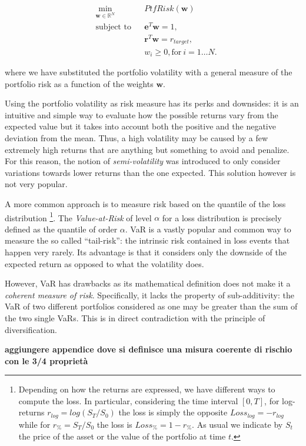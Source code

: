\begin{subequations}
	\label{eq:general_opt}
	\begin{align}
	&\!\min_{\mathbf{w}\in \mathbb{R}^{N}}     &    & PtfRisk(\mathbf{w}) \\
	& \text{subject to}   &   & \mathbf{e}^T\mathbf{w} = 1 ,\\
	&                 &       & \mathbf{r}^T\mathbf{w} = r_{target},\label{eq:constraint2} \\
	&		   &      & w_{i} \geq 0, \text{for} \: i = 1\dots N. 
	\end{align}
\end{subequations}

where we have substituted the portfolio volatility with a general measure of the portfolio risk as a function of the weights $\mathbf{w}$.

Using the portfolio volatility as risk measure has its perks and downsides: it is an intuitive and simple way to evaluate how the possible returns vary from the expected value but it takes into account both the positive and the negative deviation from the mean. Thus, a high volatility may be caused by a few extremely high returns that are anything but something to avoid and penalize.
For this reason, the notion of \textit{semi-volatility} was introduced to only consider variations towards lower returns than the one expected. This solution however is not very popular.

A more common approach is to measure risk based on the quantile of the loss distribution \footnote{Depending on how the returns are expressed, we have different ways to compute the loss. In particular, considering the time interval $[0, T]$, for log-returns $r_{log}=log(S_T/S_0)$ the loss is simply the opposite $Loss_{log} = - r_{log}$ while for $r_\% = S_T/S_0$  the loss is $Loss_\% = 1 - r_\%$. As usual we indicate by $S_t$ the price  of the asset or the value of the portfolio at time $t$.}. The \textit{Value-at-Risk} of level $\alpha$ for a loss distribution is precisely defined as the quantile of order $\alpha$.  
VaR is a vastly popular and common way to measure the so called ``tail-risk'': the intrinsic risk contained in loss events that happen very rarely. 
Its advantage is that it considers only the downside of the expected return as opposed to what the volatility does.

However, VaR has drawbacks as its mathematical definition does not make it a \textit{coherent measure of risk}. Specifically, it lacks the property of sub-additivity: the VaR of two different portfolios  considered as one may be greater than the sum of the two single VaRs. This is in direct contradiction with the principle of diversification.

\textbf{aggiungere appendice dove si definisce una misura coerente di rischio con le 3/4 proprietà}
